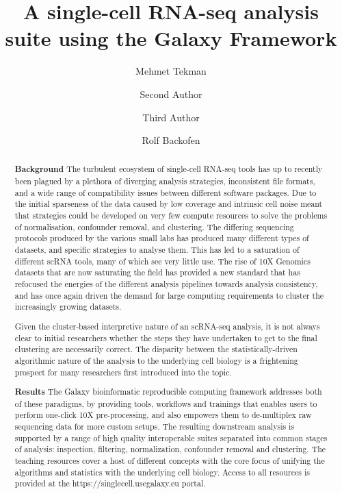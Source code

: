 \documentclass[a4paper,num-refs]{oup-contemporary}
\title{A single-cell RNA-seq analysis suite using the Galaxy Framework}
\author[1,\authfn{1},\authfn{2}]{Mehmet Tekman}
\author[2,\authfn{1},\authfn{2}]{Second Author}
\author[2]{Third Author}
\author[1,\authfn{1}]{Rolf Backofen}
\affil[1]{Chair of Bioinformatics, University of Freiburg, Freiburg, Germany, }
\affil[2]{Second Institution}
\begin{document}
\begin{frontmatter}
\maketitle
\begin{abstract}
\textbf{Background} The turbulent ecosystem of single-cell RNA-seq tools has up to recently been plagued by a plethora of diverging analysis strategies, inconsistent file formats, and a wide range of compatibility issues between different software packages. Due to the initial sparseness of the data caused by low coverage and intrinsic cell noise meant that strategies could be developed on very few compute resources to solve the problems of normalisation, confounder removal, and clustering. The differing sequencing protocols produced by the various small labs has produced many different types of datasets, and specific strategies to analyse them. This has led to a saturation of different scRNA tools, many of which see very little use. The rise of 10X Genomics datasets that are now saturating the field has provided a new standard that has refocused the energies of the different analysis pipelines towards analysis consistency, and has once again driven the demand for large computing requirements to cluster the increasingly growing datasets.

Given the cluster-based interpretive nature of an scRNA-seq analysis, it is not always clear to initial researchers whether the steps they have undertaken to get to the final clustering are necessarily correct. The disparity between the statistically-driven algorithmic nature of the analysis to the underlying cell biology is a frightening prospect for many researchers first introduced into the topic.

\textbf{Results}
The Galaxy bioinformatic reproducible computing framework addresses both of these paradigms, by providing tools, workflows and trainings that enables users to perform one-click 10X pre-processing, and also empowers them to de-multiplex raw sequencing data for more custom setups. The resulting downstream analysis is supported by a range of high quality interoperable suites separated into common stages of analysis: inspection, filtering, normalization, confounder removal and clustering. The teaching resources cover a host of different concepts with the core focus of unifying the algorithms and statistics with the underlying cell biology. Access to all resources is provided at the https://singlecell.usegalaxy.eu portal.


\end{abstract}
\end{frontmatter}
\end{document}
